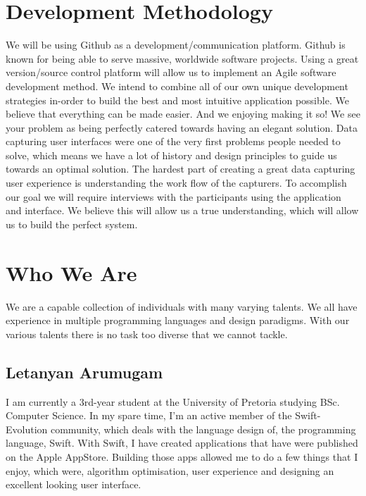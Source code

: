 \documentclass[12pt]{article}
\begin{document}
	\section{Development Methodology}
	We will be using Github as a development/communication platform. Github is known for being able to serve massive, worldwide software projects. Using a great version/source control platform will allow us to implement an Agile software development method. We intend to combine all of our own unique development strategies in-order to build the best and most intuitive application possible. We believe that everything can be made easier. And we enjoying making it so! We see your problem as being perfectly catered towards having an elegant solution. Data capturing user interfaces were one of the very first problems people needed to solve, which means we have a lot of history and design principles to guide us towards an optimal solution. The hardest part of creating a great data capturing user experience is understanding the work flow of the capturers. To accomplish our goal we will require interviews with the participants using the application and interface. We believe this will allow us a true understanding, which will allow us to build the perfect system.
	
	\section{Who We Are}
	We are a capable collection of individuals with many varying talents. We all have experience in multiple programming languages and design paradigms. With our various talents there is no task too diverse that we cannot tackle.
	
	\subsection{Letanyan Arumugam}
I am currently a 3rd-year student at the University of Pretoria studying BSc. Computer Science. In my spare time, I'm an active member of the Swift-Evolution community, which deals with the language design of, the programming language, Swift. With Swift, I have created applications that have were published on the Apple AppStore. Building those apps allowed me to do a few things that I enjoy, which were, algorithm optimisation, user experience and designing an excellent looking user interface.
\end{document}
